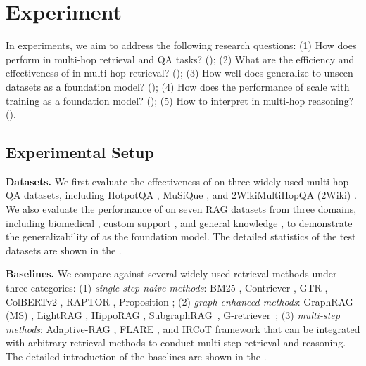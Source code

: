 \section{Experiment}\label{sec:experiment}
In experiments, we aim to address the following research questions: (1) How does \ourmethod perform in multi-hop retrieval and QA tasks? (); (2) What are the efficiency and effectiveness of \ourmethod in multi-hop retrieval? (); (3) How well does \ourmethod generalize to unseen datasets as a foundation model? (); (4) How does the performance of \ourmethod scale with training as a foundation model? (); (5) How to interpret \ourmethod in multi-hop reasoning? ().

\subsection{Experimental Setup}\label{sec:setup}
\noindent\textbf{Datasets.} We first evaluate the effectiveness of \ourmethod on three widely-used multi-hop QA datasets, including HotpotQA \citep{yang2018hotpotqa}, MuSiQue \citep{trivedi2022musique}, and 2WikiMultiHopQA (2Wiki) \citep{ho2020constructing}. We also evaluate the performance of \ourmethod on seven RAG datasets from three domains, including biomedical \citep{jin-etal-2019-pubmedqa}, custom support \citep{sadat-etal-2023-delucionqa,nandy-etal-2021-question-answering,malaviya2023expertqa,castelli-etal-2020-techqa}, and general knowledge \citep{nguyen2016ms,kamalloo2023hagrid}, to demonstrate the generalizability of \ourmethod as the foundation model. The detailed statistics of the test datasets are shown in the .

\noindent\textbf{Baselines.} We compare against several widely used retrieval methods under three categories: (1) \emph{single-step naive methods}: BM25 \citep{robertson1994some}, Contriever \citep{izacardunsupervised}, GTR \citep{ni2022large}, ColBERTv2 \citep{santhanam2022colbertv2}, RAPTOR \citep{sarthiraptor}, Proposition \citep{chen-etal-2024-dense}; (2) \emph{graph-enhanced methods}: GraphRAG (MS) \citep{edge2024local}, LightRAG \citep{guo2024lightrag}, HippoRAG \citep{gutiérrez2024hipporag}, SubgraphRAG~\citep{lisimple}, G-retriever~\citep{he2024g}; (3) \emph{multi-step methods}: Adaptive-RAG \citep{jeong2024adaptive}, FLARE \citep{jiang2023active}, and IRCoT \citep{trivedi2023interleaving} framework that can be integrated with arbitrary retrieval methods to conduct multi-step retrieval and reasoning. The detailed introduction of the baselines are shown in the .

